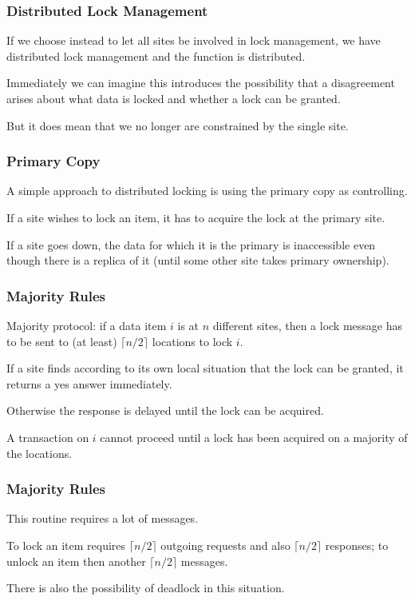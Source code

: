 \begin{frame}
\frametitle{Distributed Lock Management}
If we choose instead to let all sites be involved in lock management, we have distributed lock management and the function is distributed. 

Immediately we can imagine this introduces the possibility that a disagreement arises about what data is locked and whether a lock can be granted.

But it does mean that we no longer are constrained by the single site. 

\end{frame}

\begin{frame}
\frametitle{Primary Copy}

A simple approach to distributed locking is using the primary copy as controlling. 

If a site wishes to lock an item, it has to acquire the lock at the primary site. 

If a site goes down, the data for which it is the primary is inaccessible even though there is a replica of it (until some other site takes primary ownership).


\end{frame}

\begin{frame}
\frametitle{Majority Rules}

Majority protocol: if a data item $i$ is at $n$ different sites, then a lock message has to be sent to (at least) $\lceil n/2 \rceil$ locations to lock $i$. 

If a site finds according to its own local situation that the lock can be granted, it returns a yes answer immediately.

Otherwise the response is delayed until the lock can be acquired. 

A transaction on $i$ cannot proceed until a lock has been acquired on a majority of the locations.

\end{frame}


\begin{frame}
\frametitle{Majority Rules}

This routine requires a lot of messages. 

To lock an item requires $\lceil n/2 \rceil$ outgoing requests and also  $\lceil n/2 \rceil$ responses; to unlock an item then another $\lceil n/2 \rceil$ messages.

There is also the possibility of deadlock in this situation.

\end{frame}


